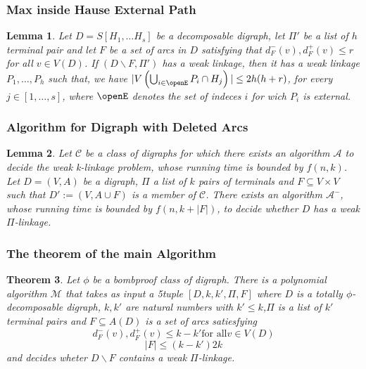 \documentclass{beamer}
\newtheorem{thm}{Theorem}[section]
\newtheorem{lemma}[thm]{Lemma}
\begin{document}
\begin{frame}
    \frametitle{Max inside Hause External Path}
    \begin{lemma}
        Let $D=S[H_1,\dots H_s]$ be a decomposable digraph, let $\Pi'$ be a list of $h$ terminal pair and let $F$ be a set of arcs in $D$ satisfying that $d^-_F(v),d^+_F(v) \leq r$ for all $v \in V(D)$. If $(D\backslash F,\Pi')$ has a weak linkage, then it has a weak linkage $P_1,\dots , P_h$ such that, we have $|V\left( \bigcup_{i\in \openE} P_i\cap H_j \right)|\leq 2h(h+r)$, for every $j\in [1,\dots,s]$, where $\openE$ denotes the set of indeces $i$ for wich $P_i$ is external.
    \end{lemma}
\end{frame}
\begin{frame}
    \frametitle{Algorithm for Digraph with Deleted Arcs}
    \begin{lemma}
        Let $\mathcal{C}$ be a class of digraphs for which there exists an algorithm $\mathcal{A}$ to decide the weak k-linkage problem, whose running time is bounded by $f(n,k)$. Let $D=(V,A)$ be a digraph, $\Pi$ a list of $k$ pairs of terminals and $F\subseteq V\times V$ such that $D':= (V,A\cup F)$ is a member of $\mathcal{C}$. There exists an algorithm  $\mathcal{A}^-$, whose running time is bounded by $f(n,k+|F|)$, to decide whether $D$ has a weak $\Pi$-linkage.
    \end{lemma}
\end{frame}
\begin{frame}
    \frametitle{The theorem of the main Algorithm}
    \begin{thm}
        Let $\phi$ be a bombproof class of digraph. There is a polynomial algorithm $\mathcal{M}$ that takes as input a 5tuple $[D,k,k',\Pi,F]$ where $D$ is a totally $\phi$-decomposable digraph, $k,k'$ are natural numbers with $k'\leq k$,$\Pi$ is a list of $k'$ terminal pairs and $F\subseteq A(D)$ is a set of arcs satiesfying 
        \begin{equation}
            d_F^-(v),d_F^+(v)\leq k-k' \text{for all} v\in V(D)
        \end{equation}
        \begin{equation*}
            |F|\leq (k-k')2k
        \end{equation*}
        and decides wheter $D\backslash F$ contains a weak $\Pi$-linkage.
    \end{thm}
\end{frame}



\end{document}
